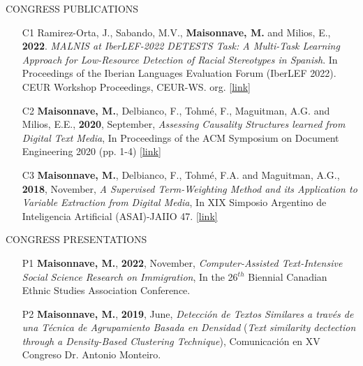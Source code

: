 \documentclass{resume} %
\begin{document}
\begin{rSection}{CONGRESS PUBLICATIONS}
\smallskip
\begin{itemize}
    
\item[C1]  Ramirez-Orta, J., Sabando, M.V.,\textbf{ Maisonnave, M.} and Milios, E., \textbf{2022}. \textit{MALNIS at IberLEF-2022 DETESTS Task: A Multi-Task Learning Approach for Low-Resource Detection of Racial Stereotypes in Spanish}. In Proceedings of the Iberian Languages Evaluation Forum (IberLEF 2022). CEUR Workshop Proceedings, CEUR-WS. org.
\href{https://ceur-ws.org/Vol-3202/detests-paper2.pdf}{[link]}

\item[C2]  \textbf{Maisonnave, M.}, Delbianco, F., Tohmé, F., Maguitman, A.G. and Milios, E.E., \textbf{2020}, September, \textit{Assessing Causality Structures learned from Digital Text Media}, In Proceedings of the ACM Symposium on Document Engineering 2020 (pp. 1-4)
\href{https://dl.acm.org/doi/10.1145/3395027.3419594}{[link]}

\item[C3]  \textbf{Maisonnave, M.}, Delbianco, F., Tohmé, F.A. and Maguitman, A.G., \textbf{2018}, November, \textit{A Supervised Term-Weighting Method and its Application to Variable Extraction from Digital Media}, In XIX Simposio Argentino de Inteligencia Artificial (ASAI)-JAIIO 47.
\href{https://47jaiio.sadio.org.ar/sites/default/files/ASAI-07.pdf}{[link]}
\end{itemize}

\end{rSection}


\begin{rSection}{CONGRESS PRESENTATIONS}
\begin{itemize}

\item[P1]  \textbf{Maisonnave, M.}, \textbf{2022}, November, \textit{Computer-Assisted Text-Intensive Social Science Research on Immigration}, In the 26$^{th}$ Biennial Canadian Ethnic Studies Association Conference.

\item[P2]  \textbf{Maisonnave, M.}, \textbf{2019}, June, \textit{Detección de Textos Similares a través de una Técnica de Agrupamiento Basada en Densidad} (\textit{Text similarity dectection through a Density-Based Clustering Technique}), Comunicación en XV Congreso Dr. Antonio Monteiro.
\end{itemize}
\end{rSection}
\end{document}
